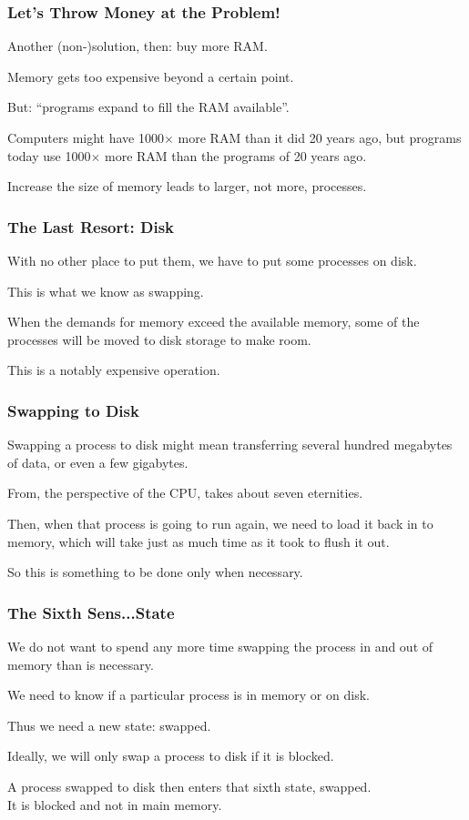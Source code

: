 \begin{frame}
\frametitle{Let's Throw Money at the Problem!}

Another (non-)solution, then: buy more RAM. 

Memory gets too expensive beyond a certain point.

But: ``programs expand to fill the RAM available''.

Computers might have 1000$\times$ more RAM than it did 20 years ago, but programs today use 1000$\times$ more RAM than the programs of 20 years ago. 

Increase the size of memory leads to larger, not more, processes.

\end{frame}

\begin{frame}
\frametitle{The Last Resort: Disk}

With no other place to put them, we have to put some processes on disk.

This is what we know as \alert{swapping}.

When the demands for memory exceed the available memory, some of the processes will be moved to disk storage to make room. 

This is a notably expensive operation.
\end{frame}

\begin{frame}
\frametitle{Swapping to Disk}

Swapping a process to disk might mean transferring several hundred megabytes of data, or even a few gigabytes. 

From, the perspective of the CPU, takes about seven eternities. 

Then, when that process is going to run again, we need to load it back in to memory, which will take just as much time as it took to flush it out. 

So this is something to be done only when necessary.

\end{frame}

\begin{frame}
\frametitle{The Sixth Sens...State}

We do not want to spend any more time swapping the process in and out of memory than is necessary.

 We need to know if a particular process is in memory or on disk.
 
Thus we need a new state: swapped.  

Ideally, we will only swap a process to disk if it is blocked. 

A process swapped to disk then enters that sixth state, swapped.\\
\quad It is blocked and not in main memory.

\end{frame}

